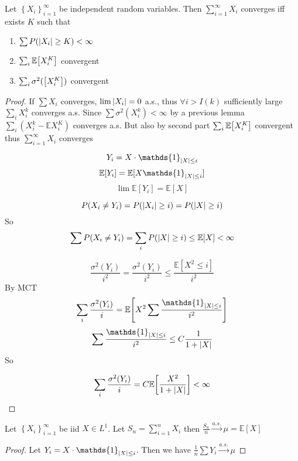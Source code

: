 
\begin{theorem}
	Let $\left\{ X_i \right\}_{i=1}^\infty$ be independent random variables. Then $\sum_{i=1}^\infty X_i$ converges iff exists $K$ such that
	\begin{enumerate}
		\item $\sum P(\abs{X_i}\geq K) <\infty$
		\item $\sum_i \mathbb{E} \qty[X_i^K]$ convergent
		\item $\sum_i \sigma^2( \qty[X_i^K])$ convergent
		
	\end{enumerate}

\begin{proof}
	If $\sum X_i$ converges, $\lim \abs{X_i} = 0$ a.s., thus $\forall i>I(k)$ sufficiently large $\sum_i X_i^k$ converges a.s. 
	Since $\sum \sigma^2(X_i^k) <\infty$ by a previous lemma $\sum_i (X_i^k - \mathbb{E} X_i^K)$ converges a.s. But also by second part   $\sum_i \mathbb{E} \qty[X_i^K]$ convergent thus  $\sum_{i=1}^\infty X_i$ converges
	
	
	$$Y_i = X \cdot \mathds{1}_{\abs{X} \leq i}$$
	$$\mathbb{E}[Y_i] = \mathbb{E}[X\mathds{1}_{\abs{X} \leq i}]$$
	$$\lim \mathbb{E} [Y_i] = \mathbb{E} [X]$$
	
	
	$$P(X_i\neq Y_i) = P(\abs{X_i}\geq i) = P(\abs{X}\geq i) $$
	So $$\sum P(X_i \neq Y_i) = \sum_i P(\abs{X} \geq i) \leq \mathbb{E} [X ] < \infty$$
	
	$$\frac{\sigma^2(Y_i)}{i^2} = \frac{\sigma^2(Y_i)}{i^2} \leq \frac{\mathbb{E} [X^2 \leq i]}{i^2}$$
	By MCT
	$$\sum_i \frac{\sigma^2(Y_i)}{i} = \mathbb{E} \qty[X^2 \sum \frac{\mathds{1}_{\abs{X} \leq i}}{i^2}]$$
	$$ \sum \frac{\mathds{1}_{\abs{X} \leq i}}{i^2} \leq C \frac{1}{1+\abs{X}}$$
	So
	
	$$\sum_i \frac{\sigma^2(Y_i)}{i} =C \mathbb{E} \qty[ \frac{X^2 }{1+\abs{X}}] < \infty$$
\end{proof}
\end{theorem}


\begin{theorem}[SLLN]
	Let $\left\{  X_i\right\}_{i=1}^\infty$ be iid $X\in L^1$. Let $S_n = \sum_{i=1}^n X_i$ then $\frac{S_n}{n} \stackrel{a.s.}{\to} \mu = \mathbb{E}[X]$
	\begin{proof}
		Let $Y_i = X \cdot \mathds{1}_{\abs{X} \leq i}$. Then we have $\frac{1}{n} \sum Y_i   \stackrel{a.s.}{\to} \mu$
	\end{proof}
\end{theorem}


